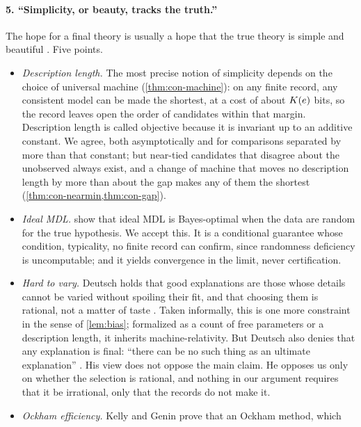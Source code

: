 \paragraph{5. ``Simplicity, or beauty, tracks the truth.''}
The hope for a final theory is usually a hope that the true theory is simple and
beautiful \citep{weinberg1992}. Five points.
\begin{itemize}
  \item \emph{Description length.} The most precise notion of simplicity depends on
        the choice of universal machine (\cref{thm:con-machine}): on any finite record,
        any consistent model can be made the shortest, at a cost of about $K(e)$
        bits, so the record leaves open the order of candidates within that margin.
        Description length is called objective because it is invariant up to an
        additive constant. We agree, both asymptotically and for comparisons separated
        by more than that constant; but near-tied candidates that disagree about the
        unobserved always exist, and a change of machine that moves no description
        length by more than about the gap makes any of them the shortest
        (\cref{thm:con-nearmin,thm:con-gap}).
  \item \emph{Ideal MDL.} \citet{vitanyi-li2000} show that ideal MDL is Bayes-optimal
        when the data are random for the true hypothesis. We accept this. It is a
        conditional guarantee whose condition, typicality, no finite record can confirm,
        since randomness deficiency is uncomputable; and it yields convergence in the
        limit, never certification.
  \item \emph{Hard to vary.} Deutsch holds that good explanations are those whose
        details cannot be varied without spoiling their fit, and that choosing them is
        rational, not a matter of taste \citep[ch.~1]{deutsch2011}. Taken informally, this is
        one more constraint in the sense of \cref{lem:bias}; formalized as a count of
        free parameters or a description length, it inherits machine-relativity. But
        Deutsch also denies that any explanation is final: ``there can be no such thing
        as an ultimate explanation'' \citep[ch.~3]{deutsch2011}. His view does not oppose the main
        claim. He opposes us only on whether the selection is rational,
        and nothing in our argument requires that it be irrational, only that the
        records do not make it.
  \item \emph{Ockham efficiency.} Kelly and Genin prove that an Ockham method, which

\end{itemize}
